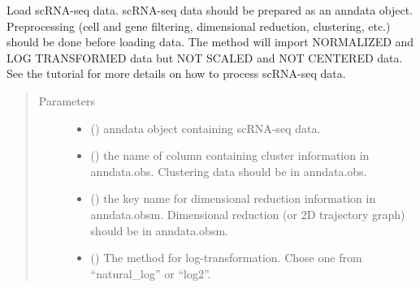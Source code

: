 \documentclass[letterpaper,10pt,english]{sphinxmanual}
\begin{document}
\begin{fulllineitems}
\begin{fulllineitems}
\label{\detokenize{modules/celloracle:celloracle.Oracle.import_anndata_as_normalized_count}}
Load scRNA-seq data. scRNA-seq data should be prepared as an anndata object.
Preprocessing (cell and gene filtering, dimensional reduction, clustering, etc.) should be done before loading data.
The method will import NORMALIZED and LOG TRANSFORMED data but NOT SCALED and NOT CENTERED data.
See the tutorial for more details on how to process scRNA-seq data.
\begin{quote}\begin{description}
\item[{Parameters}] \leavevmode\begin{itemize}
\item {} 
 () \textendash{} anndata object containing scRNA-seq data.

\item {} 
 () \textendash{} the name of column containing cluster information in anndata.obs.
Clustering data should be in anndata.obs.

\item {} 
 () \textendash{} the key name for dimensional reduction information in anndata.obsm.
Dimensional reduction (or 2D trajectory graph) should be in anndata.obsm.

\item {} 
 () \textendash{} The method for log-transformation. Chose one from “natural\_log” or “log2”.

\end{itemize}

\end{description}\end{quote}

\end{fulllineitems}



\end{fulllineitems}
\end{document}
